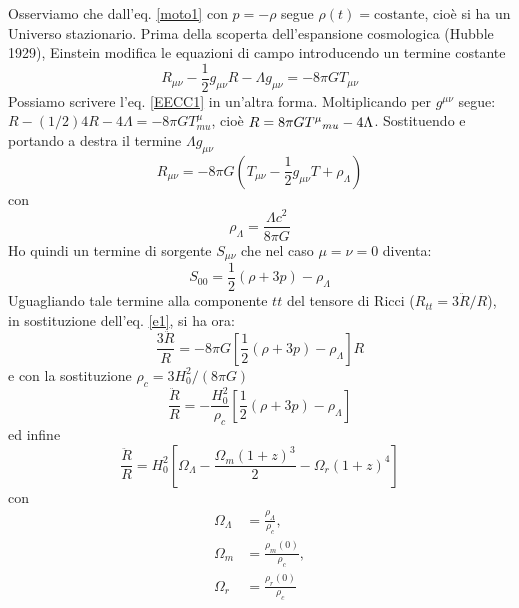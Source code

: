 Osserviamo che dall'eq. \eqref{moto1} con $p=-\rho$ segue
$\rho(t)=\text{costante}$, cioè si ha un Universo stazionario.  Prima della
scoperta dell'espansione cosmologica (Hubble 1929), Einstein modifica le
equazioni di campo introducendo un termine costante
\begin{equation}
  R_{\mu \nu} - \frac{1}{2} g_{\mu \nu} R - \Lambda g_{\mu \nu} =
  - 8 \pi G T_{\mu \nu}
  \label{EECC1}
\end{equation}
Possiamo scrivere l'eq. \eqref{EECC1} in un'altra forma.  Moltiplicando per
$g^{\mu \nu}$ segue: $R - (1/2) 4 R - 4\Lambda = -8 \pi G T^{\mu}_{mu}$, cioè
$R=8 \pi G \tensor{T}{^{\mu}}{_{mu}} -4 \Lambda$.  Sostituendo e portando a
destra il termine $\Lambda g_{\mu \nu}$
\begin{equation}
  R_{\mu \nu} = - 8 \pi G
  \left(
    T_{\mu \nu} - \frac {1}{2} g_{\mu \nu} T + \rho_{\Lambda}
  \right)
  \label{EECC2}
\end{equation}
con
\begin{equation}
  \rho_{\Lambda} = \frac {\Lambda c^2} {8 \pi G}
\end{equation}
Ho quindi un termine di sorgente $S_{\mu \nu}$ che nel caso $\mu=\nu=0$ diventa:
\begin{equation}
  S_{00} = \frac {1}{2} (\rho+3p) - \rho_{\Lambda}
\end{equation}
Uguagliando tale termine alla componente $tt$ del tensore di Ricci
($R_{tt}= 3 \ddot{R}/R$), in sostituzione dell'eq. \eqref{e1}, si ha ora:
\begin{equation}
  \frac{3 \ddot{R}}{R} = - 8\pi G \left[ \frac{1}{2}  (\rho+3p) - \rho_{\Lambda} \right] R
\end{equation}
e con la sostituzione $\rho_c=3H_0^2/(8\pi G)$
\begin{equation}
  \frac {\ddot{R}} {R} = - \frac {H_0^2} {\rho_c}
  \left[
    \frac {1}{2}  (\rho+3p) - \rho_{\Lambda}
  \right]
  \label{ecc1}
\end{equation}
ed infine
\begin{equation}
  \frac {\ddot{R}} {R} = H_0^2
  \left[
    \Omega_{\Lambda} -\frac {\Omega_m (1+z)^3} {2 }  - \Omega_r (1+z)^4
  \right]
\end{equation}
con
\begin{subequations}
  \begin{align}
    \Omega_{\Lambda} & = \frac{\rho_{\Lambda}}{\rho_c}, \\
    \Omega_m         & = \frac{\rho_m(0)}{\rho_c}, \\
    \Omega_r         & = \frac{\rho_r(0)}{\rho_c}
  \end{align}
\end{subequations}
